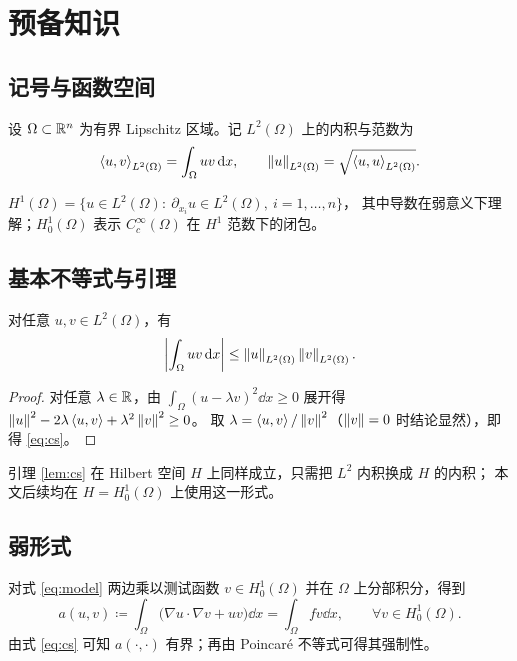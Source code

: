 \chapter{预备知识}

\section{记号与函数空间}

设 $\Omega\subset\mathbb{R}^n$ 为有界 Lipschitz 区域。记 $L^2(\Omega)$ 上的内积与范数为
\begin{equation}\label{eq:l2}
\left\langle u,v\right\rangle_{L^2(\Omega)}=\int_\Omega u v \mathop{}\!\mathrm{d} x, \qquad
\left\lVert u\right\rVert_{L^2(\Omega)}=\sqrt{\left\langle u,u\right\rangle_{L^2(\Omega)}}.
\end{equation}

\begin{definition}
$H^1(\Omega)=\bigl\{u\in L^2(\Omega):\ \partial_{x_i}u\in L^2(\Omega),\ i=1,\dots,n\bigr\}$，
其中导数在弱意义下理解；$H_0^1(\Omega)$ 表示 $C_c^\infty(\Omega)$ 在 $H^1$ 范数下的闭包。
\end{definition}

\section{基本不等式与引理}

\begin{lemma}\label{lem:cs}
对任意 $u,v\in L^2(\Omega)$，有
\begin{equation}\label{eq:cs}
\left\lvert \int_\Omega u v \mathop{}\!\mathrm{d} x\right\rvert\le \left\lVert u\right\rVert_{L^2(\Omega)}\left\lVert v\right\rVert_{L^2(\Omega)}.
\end{equation}
\end{lemma}

\begin{proof}
对任意 $\lambda\in\mathbb{R}$，由 $\int_\Omega (u-\lambda v)^2\dd x\ge 0$ 展开得
$\left\lVert u\right\rVert^2-2\lambda\left\langle u,v\right\rangle+\lambda^2\left\lVert v\right\rVert^2\ge 0$。
取 $\lambda=\left\langle u,v\right\rangle/\left\lVert v\right\rVert^2$（$\left\lVert v\right\rVert=0$ 时结论显然），即得 \eqref{eq:cs}。
\end{proof}

\begin{remark}
引理 \ref{lem:cs} 在 Hilbert 空间 $H$ 上同样成立，只需把 $L^2$ 内积换成 $H$ 的内积；
本文后续均在 $H=H_0^1(\Omega)$ 上使用这一形式。
\end{remark}

\section{弱形式}

对式 \eqref{eq:model} 两边乘以测试函数 $v\in H_0^1(\Omega)$ 并在 $\Omega$ 上分部积分，得到
\begin{equation}\label{eq:weak-form}
a(u,v)\coloneqq \int_\Omega \bigl(\nabla u\cdot\nabla v + uv\bigr)\dd x
= \int_\Omega f v \dd x, \qquad \forall v\in H_0^1(\Omega).
\end{equation}
由式 \eqref{eq:cs} 可知 $a(\cdot,\cdot)$ 有界；再由 Poincaré 不等式可得其强制性。

